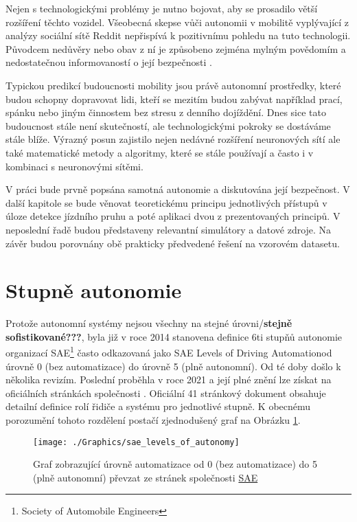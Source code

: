 \documentclass[czech, bc, kky, he, iso690alph]{fasthesis}
\begin{document}
		Nejen s technologickými problémy je nutno bojovat, aby se prosadilo větší rozšíření těchto vozidel. Všeobecná skepse vůči autonomii v mobilitě vyplývající z analýzy sociální sítě Reddit \cite{public_opinion_on_AV} nepřispívá k pozitivnímu pohledu na tuto technologii. Původcem nedůvěry nebo obav z ní je způsobeno zejména mylným povědomím a nedostatečnou informovaností o její bezpečnosti \cite{AV_vs_CV_crashes}.
		
		Typickou predikcí budoucnosti mobility jsou právě autonomní prostředky, které budou schopny dopravovat lidi, kteří se mezitím budou zabývat například prací, spánku nebo jiným činnostem bez stresu z denního dojíždění. Dnes sice tato budoucnost stále není skutečností, ale technologickými pokroky se dostáváme stále blíže. Výrazný posun zajistilo nejen nedávné rozšíření neuronových sítí ale také matematické metody a algoritmy, které se stále používají a často i v kombinaci s neuronovými sítěmi.
		
		V práci bude prvně popsána samotná autonomie a diskutována její bezpečnost. V další kapitole se bude věnovat teoretickému principu jednotlivých přístupů v úloze detekce jízdního pruhu a poté aplikaci dvou z prezentovaných principů. V neposlední řadě budou představeny relevantní simulátory a datové zdroje. Na závěr budou porovnány obě prakticky předvedené řešení na vzorovém datasetu.
    
    \section{Stupně autonomie}
       	Protože autonomní systémy nejsou všechny na stejné úrovni/\textbf{stejně sofistikované???}, byla již v roce 2014 stanovena definice 6ti stupňů autonomie organizací SAE\footnote{Society of Automobile Engineers} často odkazovaná jako SAE Levels of Driving Automation\texttrademark od úrovně 0 (bez automatizace) do  úrovně 5 (plně autonomní). Od té doby došlo k několika revizím. Poslední proběhla v roce 2021 a její plné znění lze získat na oficiálních stránkách společnosti \cite{SAE_autonomy_levels}. Oficiální 41 stránkový dokument obsahuje detailní definice rolí řidiče a systému pro jednotlivé stupně. K obecnému porozumění tohoto rozdělení postačí zjednodušený graf na Obrázku \ref{pic:levels_of_autonomy}.
       	
       		\begin{figure}[h]
       			\centering
       			\texttt{[image: ./Graphics/sae\_levels\_of\_autonomy]}
       			\caption{Graf zobrazující úrovně automatizace od 0 (bez automatizace) do 5 (plně autonomní) převzat ze stránek společnosti \href{https://www.sae.org/standards/content/j3016_202104}{SAE}}
       			\label{pic:levels_of_autonomy}
       		\end{figure}
       	
\end{document}
